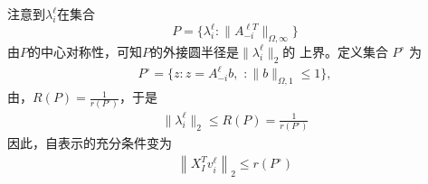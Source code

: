 \documentclass[main.tex]{subfiles}
\begin{document}
注意到$\lambda_i^\ell$在集合
$$P=\{ \lambda_i^\ell: \|A_{-i}^{\ell T}\|_{\Omega,\infty}\}$$
由$P$的中心对称性，可知$P$的外接圆半径是$\|\lambda_i^\ell\|_2$的
上界。定义集合 $P^\circ$ 为 
\begin{align*} 
  P^\circ = \{ z: z = A_{-i}^{\ell} b,\,\, : \|b\|_{\Omega,1} \leq 1\},
\end{align*} 
由\cite{ball1997intro_convex_geometry}，$R(P) = \frac{1}{r(P^\circ)}$，于是
\begin{align*} 
  \|\lambda_i^\ell \|_2 \leq R(P) = \frac{1}{r(P^\circ)}
\end{align*} 
因此，自表示的充分条件变为
\begin{align} 
  \left\|X_{I}^T v_i^\ell \right\|_{2} \leq r(P^\circ)
  \label{eq:cond1}
\end{align}

\subsection{}
\end{document}
